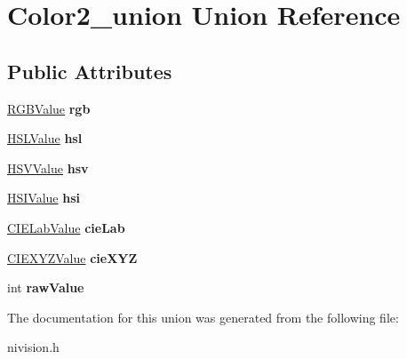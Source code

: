 \hypertarget{unionColor2__union}{\section{\-Color2\-\_\-union \-Union \-Reference}
\label{unionColor2__union}
}
\subsection*{\-Public \-Attributes}
\begin{DoxyCompactItemize}
\item 
\hypertarget{unionColor2__union_a80cbbcacb2b7b797451fd6848294b5d8}{\hyperlink{structRGBValue__struct}{\-R\-G\-B\-Value} {\bfseries rgb}}\label{unionColor2__union_a80cbbcacb2b7b797451fd6848294b5d8}

\item 
\hypertarget{unionColor2__union_a68ca8d690d2c0e9e8441b41ef8e46390}{\hyperlink{structHSLValue__struct}{\-H\-S\-L\-Value} {\bfseries hsl}}\label{unionColor2__union_a68ca8d690d2c0e9e8441b41ef8e46390}

\item 
\hypertarget{unionColor2__union_aa3e35262e49838b6399f193ba04b8925}{\hyperlink{structHSVValue__struct}{\-H\-S\-V\-Value} {\bfseries hsv}}\label{unionColor2__union_aa3e35262e49838b6399f193ba04b8925}

\item 
\hypertarget{unionColor2__union_a8491abb537c1c5edf05b50f0533207f0}{\hyperlink{structHSIValue__struct}{\-H\-S\-I\-Value} {\bfseries hsi}}\label{unionColor2__union_a8491abb537c1c5edf05b50f0533207f0}

\item 
\hypertarget{unionColor2__union_a63de8b4911f4638c7197b82130cb7d11}{\hyperlink{structCIELabValue__struct}{\-C\-I\-E\-Lab\-Value} {\bfseries cie\-Lab}}\label{unionColor2__union_a63de8b4911f4638c7197b82130cb7d11}

\item 
\hypertarget{unionColor2__union_a146246adceafca16c845453cf27a231c}{\hyperlink{structCIEXYZValue__struct}{\-C\-I\-E\-X\-Y\-Z\-Value} {\bfseries cie\-X\-Y\-Z}}\label{unionColor2__union_a146246adceafca16c845453cf27a231c}

\item 
\hypertarget{unionColor2__union_aa3d1d3760c0a471d565ac9d9f2458959}{int {\bfseries raw\-Value}}\label{unionColor2__union_aa3d1d3760c0a471d565ac9d9f2458959}

\end{DoxyCompactItemize}


\-The documentation for this union was generated from the following file\-:\begin{DoxyCompactItemize}
\item 
nivision.\-h\end{DoxyCompactItemize}
